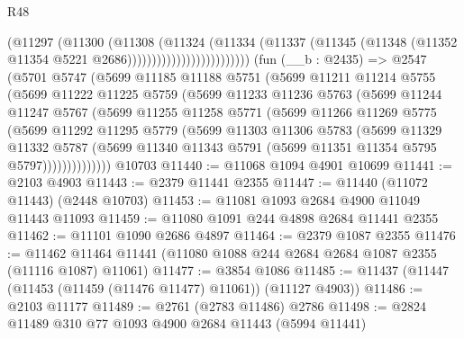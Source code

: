 \begin{lexlean}{R48}
\begin{coremodule}
                                    (@11297
                                      (@11300
                                        (@11308
                                          (@11324
                                            (@11334
                                              (@11337
                                                (@11345
                                                  (@11348
                                                    (@11352
                                                      @11354
                                                      @5221
                                                      @2686)))))))))))))))))))))))))
    (fun (__b : @2435) =>
    @2547
      (@5701
        @5747
        (@5699
          @11185
          @11188
          @5751
          (@5699
            @11211
            @11214
            @5755
            (@5699
              @11222
              @11225
              @5759
              (@5699
                @11233
                @11236
                @5763
                (@5699
                  @11244
                  @11247
                  @5767
                  (@5699
                    @11255
                    @11258
                    @5771
                    (@5699
                      @11266
                      @11269
                      @5775
                      (@5699
                        @11292
                        @11295
                        @5779
                        (@5699
                          @11303
                          @11306
                          @5783
                          (@5699
                            @11329
                            @11332
                            @5787
                            (@5699
                              @11340
                              @11343
                              @5791
                              (@5699 @11351 @11354 @5795 @5797))))))))))))))
    @10703
@11440 := @11068 @1094 @4901 @10699
@11441 := @2103 @4903
@11443 := @2379 @11441 @2355
@11447 := @11440 (@11072 @11443) (@2448 @10703)
@11453 := @11081 @1093 @2684 @4900 @11049 @11443 @11093
@11459 := @11080 @1091 @244 @4898 @2684 @11441 @2355
@11462 := @11101 @1090 @2686 @4897
@11464 := @2379 @1087 @2355
@11476 := @11462 @11464 @11441 (@11080 @1088 @244 @2684 @2684 @1087 @2355 (@11116 @1087) @11061)
@11477 := @3854 @1086
@11485 := @11437 (@11447 (@11453 (@11459 (@11476 @11477) @11061)) (@11127 @4903))
@11486 := @2103 @11177
@11489 := @2761 (@2783 @11486) @2786
@11498 := @2824 @11489 @310 @77 @1093 @4900 @2684 @11443 (@5994 @11441)

\end{coremodule}
\end{lexlean}
